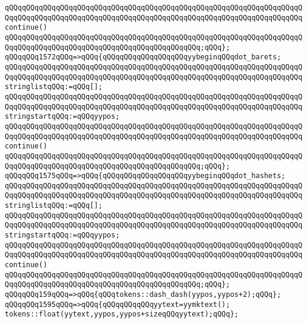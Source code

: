 \verb|qQQqqQQqqQQqqQQqqQQqqQQqqQQqqQQqqQQqqQQqqQQqqQQqqQQqqQQqqQQqqQQqqQQqqQQqqQQqqQQqqQQqqQQqqQQqqQQqqQQqqQQqqQQqqQQqqQQqqQQqqQQqqQQqqQQqqQQqqQQqcontinue()|\newline
\verb|qQQqqQQqqQQqqQQqqQQqqQQqqQQqqQQqqQQqqQQqqQQqqQQqqQQqqQQqqQQqqQQqqQQqqQQqqQQqqQQqqQQqqQQqqQQqqQQqqQQqqQQqqQQqqQQqqQQq;qQQq};|\newline
\verb|qQQqqQQq1572qQQq=>qQQq{qQQqqQQqqQQqqQQqqQQqyybeginqQQqdot_barets;|\newline
\verb|qQQqqQQqqQQqqQQqqQQqqQQqqQQqqQQqqQQqqQQqqQQqqQQqqQQqqQQqqQQqqQQqqQQqqQQqqQQqqQQqqQQqqQQqqQQqqQQqqQQqqQQqqQQqqQQqqQQqqQQqqQQqqQQqqQQqqQQqqQQqstringlistqQQq:=qQQq[];|\newline
\verb|qQQqqQQqqQQqqQQqqQQqqQQqqQQqqQQqqQQqqQQqqQQqqQQqqQQqqQQqqQQqqQQqqQQqqQQqqQQqqQQqqQQqqQQqqQQqqQQqqQQqqQQqqQQqqQQqqQQqqQQqqQQqqQQqqQQqqQQqqQQqstringstartqQQq:=qQQqyypos;|\newline
\verb|qQQqqQQqqQQqqQQqqQQqqQQqqQQqqQQqqQQqqQQqqQQqqQQqqQQqqQQqqQQqqQQqqQQqqQQqqQQqqQQqqQQqqQQqqQQqqQQqqQQqqQQqqQQqqQQqqQQqqQQqqQQqqQQqqQQqqQQqqQQqcontinue()|\newline
\verb|qQQqqQQqqQQqqQQqqQQqqQQqqQQqqQQqqQQqqQQqqQQqqQQqqQQqqQQqqQQqqQQqqQQqqQQqqQQqqQQqqQQqqQQqqQQqqQQqqQQqqQQqqQQqqQQqqQQq;qQQq};|\newline
\verb|qQQqqQQq1575qQQq=>qQQq{qQQqqQQqqQQqqQQqqQQqyybeginqQQqdot_hashets;|\newline
\verb|qQQqqQQqqQQqqQQqqQQqqQQqqQQqqQQqqQQqqQQqqQQqqQQqqQQqqQQqqQQqqQQqqQQqqQQqqQQqqQQqqQQqqQQqqQQqqQQqqQQqqQQqqQQqqQQqqQQqqQQqqQQqqQQqqQQqqQQqqQQqstringlistqQQq:=qQQq[];|\newline
\verb|qQQqqQQqqQQqqQQqqQQqqQQqqQQqqQQqqQQqqQQqqQQqqQQqqQQqqQQqqQQqqQQqqQQqqQQqqQQqqQQqqQQqqQQqqQQqqQQqqQQqqQQqqQQqqQQqqQQqqQQqqQQqqQQqqQQqqQQqqQQqstringstartqQQq:=qQQqyypos;|\newline
\verb|qQQqqQQqqQQqqQQqqQQqqQQqqQQqqQQqqQQqqQQqqQQqqQQqqQQqqQQqqQQqqQQqqQQqqQQqqQQqqQQqqQQqqQQqqQQqqQQqqQQqqQQqqQQqqQQqqQQqqQQqqQQqqQQqqQQqqQQqqQQqcontinue()|\newline
\verb|qQQqqQQqqQQqqQQqqQQqqQQqqQQqqQQqqQQqqQQqqQQqqQQqqQQqqQQqqQQqqQQqqQQqqQQqqQQqqQQqqQQqqQQqqQQqqQQqqQQqqQQqqQQqqQQqqQQq;qQQq};|\newline
\verb|qQQqqQQq159qQQq=>qQQq{qQQqtokens::dash_dash(yypos,yypos+2);qQQq};|\newline
\verb|qQQqqQQq1595qQQq=>qQQq{qQQqqQQqqQQqyytext=yymktext();|\newline
\verb|tokens::float(yytext,yypos,yypos+sizeqQQqyytext);qQQq};|\newline

